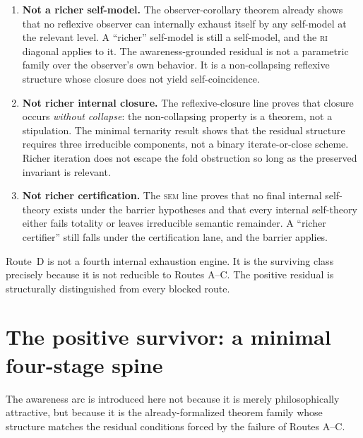 \documentclass[11pt]{article}
\theoremstyle{plain}
\theoremstyle{definition}
\theoremstyle{remark}
\newcommand{\RI}{\textsc{ri}}
\newcommand{\SEM}{\textsc{sem}}
\begin{document}
\begin{enumerate}[label=(\arabic*),leftmargin=2.2em]
\item \textbf{Not a richer self-model.}
      The observer-corollary theorem already shows that no reflexive
      observer can internally exhaust itself by any self-model at the
      relevant level.  A ``richer'' self-model is still a self-model, and
      the \RI{} diagonal applies to it.  The awareness-grounded residual
      is not a parametric family over the observer's own behavior.  It is
      a non-collapsing reflexive structure whose closure does not yield
      self-coincidence.

\item \textbf{Not richer internal closure.}
      The reflexive-closure line proves that closure occurs \emph{without
      collapse}: the non-collapsing property is a theorem, not a
      stipulation.  The minimal ternarity result shows that the residual
      structure requires three irreducible components, not a binary
      iterate-or-close scheme.  Richer iteration does not escape the
      fold obstruction so long as the preserved invariant is relevant.

\item \textbf{Not richer certification.}
      The \SEM{} line proves that no final internal self-theory exists
      under the barrier hypotheses and that every internal self-theory
      either fails totality or leaves irreducible semantic remainder.
      A ``richer certifier'' still falls under the certification lane,
      and the barrier applies.
\end{enumerate}

\begin{keybox}[title={Route D is not Routes A--C}]
Route~D is not a fourth internal exhaustion engine.  It is the surviving
class precisely because it is not reducible to Routes A--C.  The positive
residual is structurally distinguished from every blocked route.
\end{keybox}

\section{The positive survivor: a minimal four-stage spine}
\label{sec:spine}

The awareness arc is introduced here not because it is merely
philosophically attractive, but because it is the already-formalized
theorem family whose structure matches the residual conditions forced by
the failure of Routes A--C.
\end{document}
